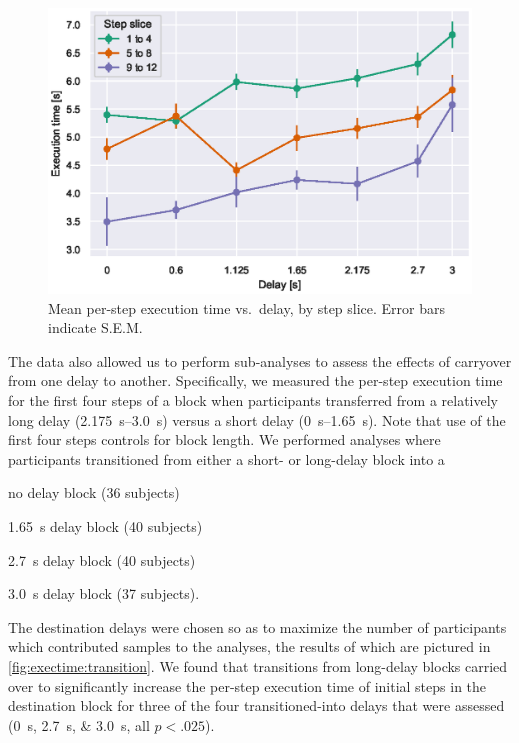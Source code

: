 \documentclass[10pt,letterpaper]{article}
\begin{document}
\begin{figure}[h]
    \centering
    \includegraphics[width=.8\textwidth]{plots/exec_time_delay_slice.eps}
    \caption{Mean per-step execution time vs.\ delay, by step slice.
    Error bars indicate S.E.M.}
    \label{fig:exectime:delay:slice}
\end{figure}

The data also allowed us to perform sub-analyses to assess the effects of carryover from one delay to another.
Specifically, we measured the per-step execution time for the first four steps of a block when participants transferred from a relatively long delay (\SIrange{2.175}{3.0}{\second}) versus a short delay (\SIrange{0}{1.65}{\second}).
Note that use of the first four steps controls for block length.
We performed analyses where participants transitioned from either a short- or long-delay block into a
\begin{enumerate*}[label=(\roman*), before=\unskip{: }, itemjoin={{; }}, itemjoin*={{; and }}]
  \item no delay block (36 subjects)
  \item \SI{1.65}{\second} delay block (40 subjects)
  \item \SI{2.7}{\second} delay block (40 subjects)
  \item \SI{3.0}{\second} delay block (37 subjects).
\end{enumerate*}
The destination delays were chosen so as to maximize the number of participants which contributed samples to the analyses, the results of which are pictured in \cref{fig:exectime:transition}.
We found that transitions from long-delay blocks carried over to significantly increase the per-step execution time of initial steps in the destination block for three of the four transitioned-into delays that were assessed (\SIlist{0;2.7;3.0}{\second}, all \( p < .025\)).
\end{document}
